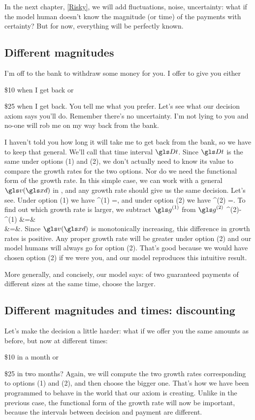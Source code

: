 In the next chapter, \cref{Risky}, we will add fluctuations, noise, uncertainty: what if the 
model human doesn't know the magnitude (or time) of the payments with certainty? But for now, 
everything will be perfectly known.

\subsection{Different magnitudes}
I'm off to the bank to withdraw some money for you. I offer to give you either
\bi
\item[(1)] \$10 when I get back or 
\item[(2)] \$25 when I get back. You tell me what you prefer.
\ei
Let's see what our decision axiom says you'll do. Remember there's no uncertainty. I'm not lying to 
you and no-one will rob me on my way back from the bank.

I haven't told you how long it will take me to get back from the bank, so we have to keep that general. We'll call that time interval $\Dt$. Since $\Dt$ is the same under options (1) and (2), we 
don't actually need to know its value to compare the growth rates for the two options. Nor do we need the functional form of the growth rate. In this simple case, we can work with a general 
$\gv(\xd)$ in , and any growth rate should give us the same decision. Let's see. Under option (1) we have
\be
\g^{(1)} =,
\ee
and under option (2) we have
\be
\g^{(2)} =.
\ee
To find out which growth rate is larger, we subtract $\g^{(1)}$ from $\g^{(2)}$ 
\bea
\g^{(2)}-\g^{(1)} &=&\\
 &=&.
\eea
Since $\gv(\xd)$ is monotonically increasing, this difference in growth rates is positive. Any proper growth rate will be greater under option (2) and 
our model humans will always go for option (2). That's good because we would have chosen option (2) if we were you, and 
our model reproduces this intuitive result.

More generally, and concisely, our model says: of two guaranteed payments of different sizes at the same time, choose the larger.

\subsection{Different magnitudes and times: discounting}
Let's make the decision a little harder: what if we offer you the same amounts as before, but now at different times:
\bi
\item[(1)] \$10 in a month or 
\item[(2)] \$25 in two months?
\ei
Again, we will compute the two growth rates corresponding to options (1) and (2), and then choose the bigger one. That's how we have been programmed to behave in the world that our axiom is creating. Unlike in the previous case, the functional form of the growth rate will now be important, because the intervals between decision and payment are different. 

